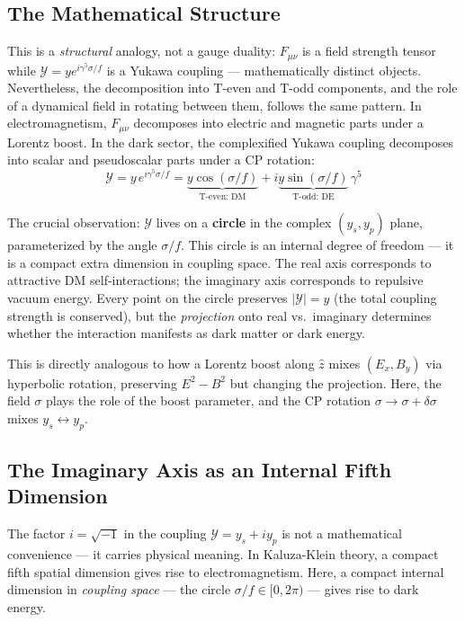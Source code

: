 \subsection{The Mathematical Structure}

This is a \emph{structural} analogy, not a gauge duality:
$F_{\mu\nu}$ is a field strength tensor while
$\mathcal{Y} = ye^{i\gamma^5\sigma/f}$ is a Yukawa coupling ---
mathematically distinct objects. Nevertheless, the decomposition
into T-even and T-odd components, and the role of a dynamical field
in rotating between them, follows the same pattern.
In electromagnetism, $F_{\mu\nu}$
decomposes into electric and magnetic parts under a Lorentz boost. In the
dark sector, the complexified Yukawa coupling decomposes into scalar and
pseudoscalar parts under a CP rotation:
\begin{equation}
  \mathcal{Y} = y\,e^{i\gamma^5\sigma/f}
  = \underbrace{y\cos(\sigma/f)}_{\text{T-even: DM}}
  + i\underbrace{y\sin(\sigma/f)}_{\text{T-odd: DE}}\,\gamma^5
\end{equation}

The crucial observation: $\mathcal{Y}$ lives on a \textbf{circle} in the
complex $(y_s, y_p)$ plane, parameterized by the angle $\sigma/f$. This
circle is an internal degree of freedom --- it is a compact extra dimension
in coupling space. The real axis corresponds to attractive DM self-interactions;
the imaginary axis corresponds to repulsive vacuum energy. Every point on the
circle preserves $|\mathcal{Y}| = y$ (the total coupling strength is conserved),
but the \emph{projection} onto real vs.~imaginary determines whether the
interaction manifests as dark matter or dark energy.

This is directly analogous to how a Lorentz boost along $\hat{z}$ mixes
$(E_x, B_y)$ via hyperbolic rotation, preserving $E^2 - B^2$ but changing
the projection. Here, the field $\sigma$ plays the role of the boost
parameter, and the CP rotation $\sigma \to \sigma + \delta\sigma$
mixes $y_s \leftrightarrow y_p$.

\subsection{The Imaginary Axis as an Internal Fifth Dimension}
\label{ch3:fifth}

The factor $i = \sqrt{-1}$ in the coupling $\mathcal{Y} = y_s + i y_p$ is
not a mathematical convenience --- it carries physical meaning. In Kaluza-Klein
theory, a compact fifth spatial dimension gives rise to electromagnetism.
Here, a compact internal dimension in \emph{coupling space} --- the circle
$\sigma/f \in [0, 2\pi)$ --- gives rise to dark energy.

